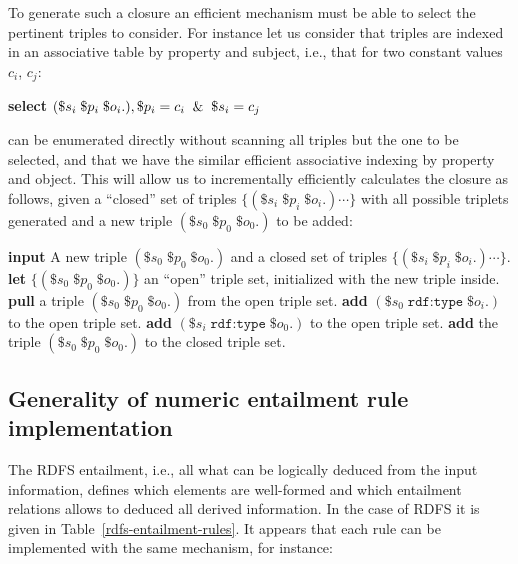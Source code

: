 To generate such a closure an efficient mechanism must be able to select the pertinent triples to consider. For instance let us consider that triples are indexed in an associative table by property and subject, i.e., that for two constant values $c_i$, $c_j$:
\begin{algorithmic}
  \State \textbf{select} $(\$s_i \; \$p_i \; \$o_i .), \$p_i = c_i \And \$s_i = c_j$
\end{algorithmic}
can be enumerated directly without scanning all triples but the one to be selected, and that we have the similar efficient associative indexing by property and object. This will allow us to incrementally efficiently calculates the closure as follows, given a ``closed'' set of triples $\{(\$s_i \; \$p_i \; \$o_i .) \cdots \}$ with all possible triplets generated and a new triple $(\$s_0 \; \$p_0 \; \$o_0 .)$ to be added:
\begin{algorithmic}
\State \textbf{input} A new triple $(\$s_0 \; \$p_0 \; \$o_0 .)$ and a closed set of triples $\{(\$s_i \; \$p_i \; \$o_i .) \cdots \}$.
\State \textbf{let} $\{(\$s_0 \; \$p_0 \; \$o_0 .)\}$ an ``open'' triple set, initialized with the new triple inside.
\Repeat
  \State \textbf{pull} a triple $(\$s_0 \; \$p_0 \; \$o_0 .)$ from the open triple set.
      \State \textbf{add} $(\$s_0 \; \texttt{rdf:type} \; \$o_i .)$ to the open triple set.
    \EndFor
      \State \textbf{add} $(\$s_i \; \texttt{rdf:type} \; \$o_0 .)$ to the open triple set.
    \EndFor
  \EndIf
  \State \textbf{add} the triple $(\$s_0 \; \$p_0 \; \$o_0 .)$ to the closed triple set.
\end{algorithmic}

\subsection{Generality of numeric entailment rule implementation} \label{RDFS-entailment-rules-2}

The RDFS entailment, i.e., all what can be logically deduced from the input information, defines which elements are well-formed and which entailment relations allows to deduced all derived information. In the case of RDFS it is given in Table~\ref{rdfs-entailment-rules}. It appears that each rule can be implemented with the same mechanism, for instance:

